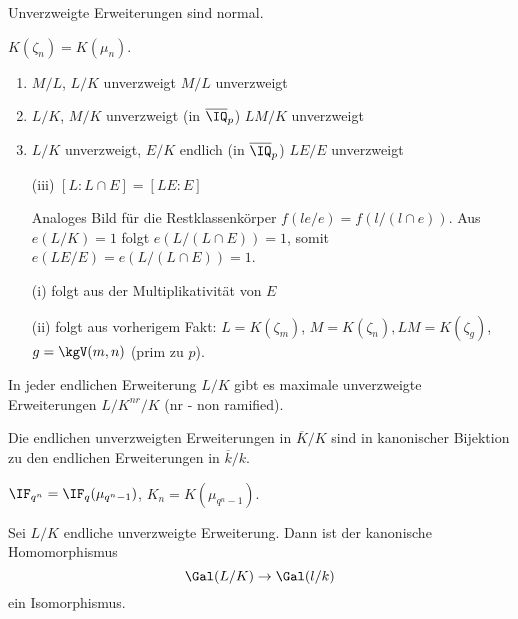\begin{Folgerung}
 Unverzweigte Erweiterungen sind normal.
\end{Folgerung}

\begin{Beweis}
 $K(\zeta_n)=K(\mu_n)$.
\end{Beweis}

\begin{Fakt}
 \begin{enumerate}
  \item $M/L$, $L/K$ unverzweigt \folge $M/L$ unverzweigt
  \item $L/K$, $M/K$ unverzweigt (in $\overline\IQ_p$) \folge $LM/K$ unverzweigt
  \item $L/K$ unverzweigt, $E/K$ endlich (in $\overline\IQ_p$) \folge $LE/E$ unverzweigt
 \end{enumerate}
\end{Fakt}

\begin{Beweis}
 \begin{enumerate}
  \item[(iii)] $[L:L\cap E]=[LE:E]$
  
  Analoges Bild für die Restklassenkörper \folge $f(le/e)=f(l/(l\cap e))$. Aus $e(L/K)=1$ folgt $e(L/(L\cap E))=1$, somit $e(LE/E)=e(L/(L\cap E))=1$.
  \item[(i)] folgt aus der Multiplikativität von $E$
  \item[(ii)] folgt aus vorherigem Fakt: $L=K(\zeta_m)$, $M=K(\zeta_n), LM=K(\zeta_g)$, $g=\kgV(m,n)$ (prim zu $p$).
 \end{enumerate}
\end{Beweis}

\begin{Folgerung}
 In jeder endlichen Erweiterung $L/K$ gibt es maximale unverzweigte Erweiterungen $L/K^{nr}/K$ (nr - non ramified).
\end{Folgerung}

\begin{Folgerung}
 Die endlichen unverzweigten Erweiterungen in $\overline K/K$ sind in kanonischer Bijektion zu den endlichen Erweiterungen in $\overline k/k$.
\end{Folgerung}

\begin{Beweis}
 $\IF_{q^n}=\IF_q(\mu_{q^n-1})$, $K_n=K(\mu_{q^n-1})$.
\end{Beweis}

\begin{Fakt}
 Sei $L/K$ endliche unverzweigte Erweiterung. Dann ist der kanonische Homomorphismus
 \[ \Gal(L/K) \rightarrow \Gal(l/k)\]
 ein Isomorphismus.
\end{Fakt}

